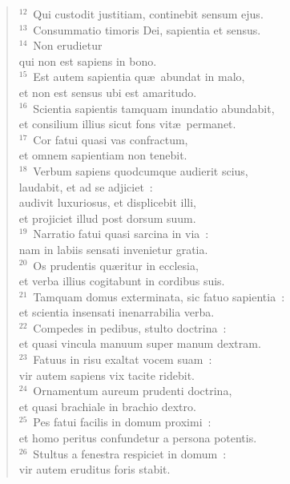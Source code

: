 \begin{verse}${}^{12}$~Qui custodit justitiam, continebit sensum ejus.\\
${}^{13}$~Consummatio timoris Dei, sapientia et sensus.\\
${}^{14}$~Non erudietur\\ qui non est sapiens in bono.\\
${}^{15}$~Est autem sapientia qu\ae\ abundat in malo,\\ et non est sensus ubi est amaritudo.\\
${}^{16}$~Scientia sapientis tamquam inundatio abundabit,\\ et consilium illius sicut fons vit\ae\ permanet.\\
${}^{17}$~Cor fatui quasi vas confractum,\\ et omnem sapientiam non tenebit.\\
${}^{18}$~Verbum sapiens quodcumque audierit scius,\\ laudabit, et ad se adjiciet~:\\ audivit luxuriosus, et displicebit illi,\\ et projiciet illud post dorsum suum.\\
${}^{19}$~Narratio fatui quasi sarcina in via~:\\ nam in labiis sensati invenietur gratia.\\
${}^{20}$~Os prudentis qu\ae ritur in ecclesia,\\ et verba illius cogitabunt in cordibus suis.\\
${}^{21}$~Tamquam domus exterminata, sic fatuo sapientia~:\\ et scientia insensati inenarrabilia verba.\\
${}^{22}$~Compedes in pedibus, stulto doctrina~:\\ et quasi vincula manuum super manum dextram.\\
${}^{23}$~Fatuus in risu exaltat vocem suam~:\\ vir autem sapiens vix tacite ridebit.\\
${}^{24}$~Ornamentum aureum prudenti doctrina,\\ et quasi brachiale in brachio dextro.\\
${}^{25}$~Pes fatui facilis in domum proximi~:\\ et homo peritus confundetur a persona potentis.\\
${}^{26}$~Stultus a fenestra respiciet in domum~:\\ vir autem eruditus foris stabit.\\

\end{verse}
